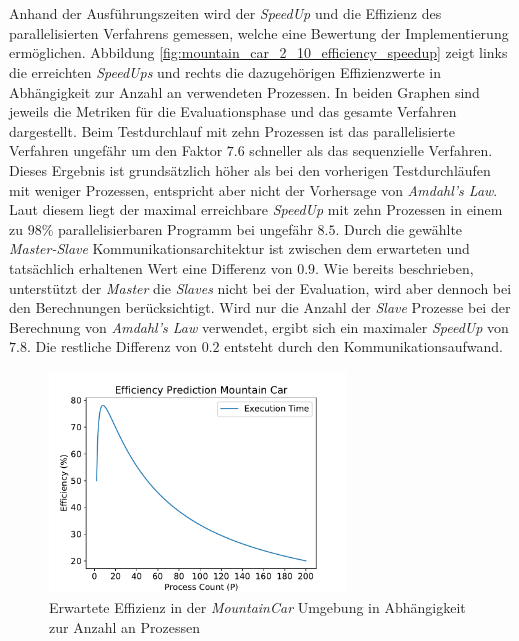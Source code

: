 \\\\
Anhand der Ausführungszeiten wird der \emph{SpeedUp} und die Effizienz des parallelisierten Verfahrens gemessen, welche eine Bewertung der Implementierung ermöglichen. Abbildung \ref{fig:mountain_car_2_10_efficiency_speedup} zeigt links die erreichten \emph{SpeedUps} und rechts die dazugehörigen Effizienzwerte in Abhängigkeit zur Anzahl an verwendeten Prozessen. In beiden Graphen sind jeweils die Metriken für die Evaluationsphase und das gesamte Verfahren dargestellt. Beim Testdurchlauf mit zehn Prozessen ist das parallelisierte Verfahren ungefähr um den Faktor $7.6$ schneller als das sequenzielle Verfahren. Dieses Ergebnis ist grundsätzlich höher als bei den vorherigen Testdurchläufen mit weniger Prozessen, entspricht aber nicht der Vorhersage von \emph{Amdahl's Law}. Laut diesem liegt der maximal erreichbare \emph{SpeedUp} mit zehn Prozessen in einem zu $98\%$ parallelisierbaren Programm bei ungefähr $8.5$. Durch die gewählte \emph{Master-Slave} Kommunikationsarchitektur ist zwischen dem erwarteten und tatsächlich erhaltenen Wert eine Differenz von $0.9$. Wie bereits beschrieben, unterstützt der \emph{Master} die \emph{Slaves} nicht bei der Evaluation, wird aber dennoch bei den Berechnungen berücksichtigt. Wird nur die Anzahl der \emph{Slave} Prozesse bei der Berechnung von \emph{Amdahl's Law} verwendet, ergibt sich ein maximaler \emph{SpeedUp} von $7.8$. Die restliche Differenz von $0.2$ entsteht durch den Kommunikationsaufwand. 
\begin{figure}[!h]
	\centering
	\includegraphics[width=0.7\textwidth]{./img/mountain_car_analysis/mountain_car_efficiency_prediction.pdf} 
	\caption{Erwartete Effizienz in der \emph{MountainCar} Umgebung in Abhängigkeit zur Anzahl an Prozessen}
	\label{fig:mountain_car_efficiency_predidction}
\end{figure}
